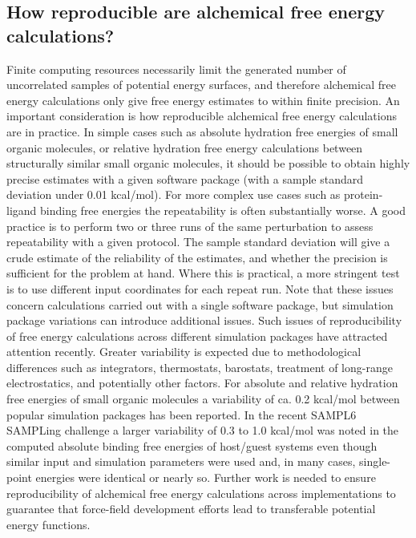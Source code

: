 \documentclass[9pt,bestpractices]{livecoms}
\begin{document}
\subsection{How reproducible are alchemical free energy calculations?}
\label{subsec:reproducible}
Finite computing resources necessarily limit the generated number of uncorrelated samples of potential energy surfaces, and therefore alchemical free energy calculations only give free energy estimates to within finite precision. An important consideration is how reproducible alchemical free energy calculations are in practice. In simple cases such as absolute hydration free energies of small organic molecules, or relative hydration free energy calculations between structurally similar small organic molecules, it should be possible to obtain highly precise estimates with a given software package (with a sample standard deviation under 0.01 kcal/mol). For more complex use cases such as protein-ligand binding free energies the repeatability is often substantially worse. A good practice is to perform two or three runs of the same perturbation to assess repeatability with a given protocol. The sample standard deviation will give a crude estimate of the reliability of the estimates, and whether the precision is sufficient for the problem at hand. Where this is practical, a more stringent test is to use different input coordinates for each repeat run. 
%
Note that these issues concern calculations carried out with a single software package, but simulation package variations can introduce additional issues. Such issues of reproducibility of free energy calculations across different simulation packages have attracted attention recently. Greater variability is expected due to methodological differences such as integrators, thermostats, barostats, treatment of long-range electrostatics, and potentially other factors. For absolute and relative hydration free energies of small organic molecules a variability of ca. 0.2 kcal/mol between popular simulation packages has been reported. \cite{REF Reproducibility of hydration free energies Loefler et al.  JCTC 2018} In the recent SAMPL6 SAMPLing challenge a larger variability of 0.3 to 1.0 kcal/mol was noted in the computed absolute binding free energies of host/guest systems even though similar input and simulation parameters were used \cite{Ref Rizzi et al SAMPLing biorxiv} and, in many cases, single-point energies were identical or nearly so. Further work is needed to ensure reproducibility of alchemical free energy calculations across implementations to guarantee that force-field development efforts lead to transferable potential energy functions. 
%
\end{document}
